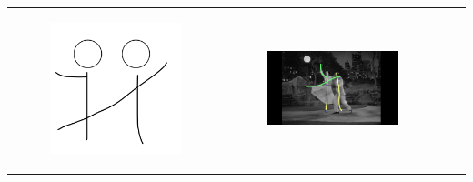 \begin{table}[!htb]
\begin{tabular}{cccc}
\begin{subfigure}{0.2\textwidth}\centering\includegraphics[scale=0.1]{img/09keyframe}\end{subfigure}&
\begin{subfigure}{0.23\textwidth}\centering\includegraphics[scale=0.08]{img/keyframe_case_9_(4)}\end{subfigure}&

\end{tabular}
\end{table}
